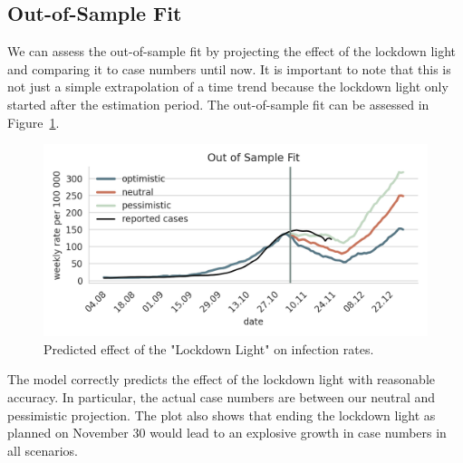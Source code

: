 \subsection{Out-of-Sample Fit}

We can assess the out-of-sample fit by projecting the effect of the lockdown light and
comparing it to case numbers until now. It is important to note that this is not just a
simple extrapolation of a time trend because the lockdown light only started after the
estimation period. The out-of-sample fit can be assessed in
Figure~\ref{fig:out-of-sample-fit}.

\begin{figure}[!tp]
    \centering
    \includegraphics[width=\textwidth]{../figures/out_of_sample_validation}
    \caption{Predicted effect of the "Lockdown Light" on infection rates.}
    \label{fig:out-of-sample-fit}
\end{figure}

The model correctly predicts the effect of the lockdown light with reasonable accuracy.
In particular, the actual case numbers are between our neutral and pessimistic
projection. The plot also shows that ending the lockdown light as planned on November 30
would lead to an explosive growth in case numbers in all scenarios.
